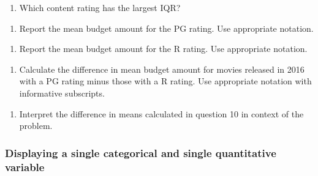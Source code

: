 \documentclass[
]{report}
\providecommand{\tightlist}{%
  \setlength{\itemsep}{0pt}\setlength{\parskip}{0pt}}
\begin{document}
\begin{enumerate}
\def\labelenumi{\arabic{enumi}.}
\setcounter{enumi}{6}
\tightlist
\item
  Which content rating has the largest IQR?
\end{enumerate}

\vspace{0.8in}

\begin{enumerate}
\def\labelenumi{\arabic{enumi}.}
\setcounter{enumi}{7}
\tightlist
\item
  Report the mean budget amount for the PG rating. Use appropriate notation.
\end{enumerate}

\vspace{0.3in}

\begin{enumerate}
\def\labelenumi{\arabic{enumi}.}
\setcounter{enumi}{8}
\tightlist
\item
  Report the mean budget amount for the R rating. Use appropriate notation.
\end{enumerate}

\vspace{0.3in}

\begin{enumerate}
\def\labelenumi{\arabic{enumi}.}
\setcounter{enumi}{9}
\tightlist
\item
  Calculate the difference in mean budget amount for movies released in 2016 with a PG rating minus those with a R rating. Use appropriate notation with informative subscripts.
\end{enumerate}

\vspace{0.8in}

\begin{enumerate}
\def\labelenumi{\arabic{enumi}.}
\setcounter{enumi}{10}
\tightlist
\item
  Interpret the difference in means calculated in question 10 in context of the problem.
\end{enumerate}

\vspace{0.5in}

\hypertarget{displaying-a-single-categorical-and-single-quantitative-variable}{%
\subsubsection*{Displaying a single categorical and single quantitative variable}\label{displaying-a-single-categorical-and-single-quantitative-variable}}
\end{document}
